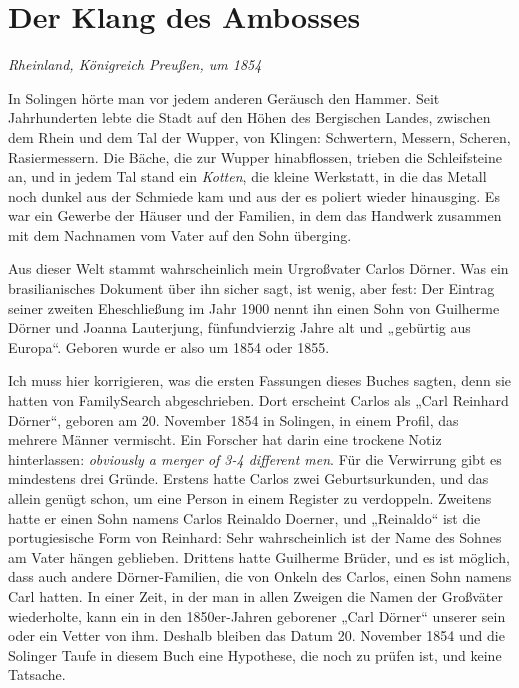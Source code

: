 \documentclass[
  ngerman,
  11pt,
  openany]{book}
\begin{document}
\section{Der Klang des Ambosses}\label{der-klang-des-ambosses}

\emph{Rheinland, Königreich Preußen, um 1854}

In Solingen hörte man vor jedem anderen Geräusch den Hammer. Seit
Jahrhunderten lebte die Stadt auf den Höhen des Bergischen Landes,
zwischen dem Rhein und dem Tal der Wupper, von Klingen: Schwertern,
Messern, Scheren, Rasiermessern. Die Bäche, die zur Wupper hinabflossen,
trieben die Schleifsteine an, und in jedem Tal stand ein \emph{Kotten},
die kleine Werkstatt, in die das Metall noch dunkel aus der Schmiede kam
und aus der es poliert wieder hinausging. Es war ein Gewerbe der Häuser
und der Familien, in dem das Handwerk zusammen mit dem Nachnamen vom
Vater auf den Sohn überging.

Aus dieser Welt stammt wahrscheinlich mein Urgroßvater Carlos Dörner.
Was ein brasilianisches Dokument über ihn sicher sagt, ist wenig, aber
fest: Der Eintrag seiner zweiten Eheschließung im Jahr 1900 nennt ihn
einen Sohn von Guilherme Dörner und Joanna Lauterjung, fünfundvierzig
Jahre alt und „gebürtig aus Europa``. Geboren wurde er also um 1854 oder
1855.

Ich muss hier korrigieren, was die ersten Fassungen dieses Buches
sagten, denn sie hatten von FamilySearch abgeschrieben. Dort erscheint
Carlos als „Carl Reinhard Dörner``, geboren am 20. November 1854 in
Solingen, in einem Profil, das mehrere Männer vermischt. Ein Forscher
hat darin eine trockene Notiz hinterlassen: \emph{obviously a merger of
3-4 different men}. Für die Verwirrung gibt es mindestens drei Gründe.
Erstens hatte Carlos zwei Geburtsurkunden, und das allein genügt schon,
um eine Person in einem Register zu verdoppeln. Zweitens hatte er einen
Sohn namens Carlos Reinaldo Doerner, und „Reinaldo`` ist die
portugiesische Form von Reinhard: Sehr wahrscheinlich ist der Name des
Sohnes am Vater hängen geblieben. Drittens hatte Guilherme Brüder, und
es ist möglich, dass auch andere Dörner-Familien, die von Onkeln des
Carlos, einen Sohn namens Carl hatten. In einer Zeit, in der man in
allen Zweigen die Namen der Großväter wiederholte, kann ein in den
1850er-Jahren geborener „Carl Dörner`` unserer sein oder ein Vetter von
ihm. Deshalb bleiben das Datum 20. November 1854 und die Solinger Taufe
in diesem Buch eine Hypothese, die noch zu prüfen ist, und keine
Tatsache.
\end{document}
